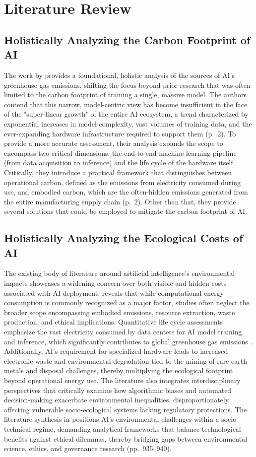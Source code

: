 \documentclass[a4paper, 12pt]{article}
\begin{document}
\section{Literature Review}
\subsection{Holistically Analyzing the Carbon Footprint of AI}
The work by \citet{Wu2022} provides a foundational, holistic analysis of the sources of AI's greenhouse gas emissions, shifting the focus beyond prior research that was often limited to the carbon footprint of training a single, massive model. The authors contend that this narrow, model-centric view has become insufficient in the face of the "super-linear growth" of the entire AI ecosystem, a trend characterized by exponential increases in model complexity, vast volumes of training data, and the ever-expanding hardware infrastructure required to support them (p.~2). To provide a more accurate assessment, their analysis expands the scope to encompass two critical dimensions: the end-to-end machine learning pipeline (from data acquisition to inference) and the life cycle of the hardware itself. Critically, they introduce a practical framework that distinguishes between operational carbon, defined as the emissions from electricity consumed during use, and embodied carbon, which are the often-hidden emissions generated from the entire manufacturing supply chain (p.~2). Other than that, they provide several solutions that could be employed to mitigate the carbon footprint of AI.

\subsection{Holistically Analyzing the Ecological Costs of AI}
The existing body of literature around artificial intelligence's environmental impacts showcases a widening concern over both visible and hidden costs associated with AI deployment. \citet{Zhuk2023} reveals that while computational energy consumption is commonly recognized as a major factor, studies often neglect the broader scope encompassing embodied emissions, resource extraction, waste production, and ethical implications. Quantitative life cycle assessments emphasize the vast electricity consumed by data centers for AI model training and inference, which significantly contributes to global greenhouse gas emissions \citep{Zhuk2023}. Additionally, AI's requirement for specialized hardware leads to increased electronic waste and environmental degradation tied to the mining of rare earth metals and disposal challenges, thereby multiplying the ecological footprint beyond operational energy use. The literature also integrates interdisciplinary perspectives that critically examine how algorithmic biases and automated decision-making exacerbate environmental inequalities, disproportionately affecting vulnerable socio-ecological systems lacking regulatory protections. The literature synthesis in \citet{Zhuk2023} positions AI's environmental challenges within a socio-technical regime, demanding analytical frameworks that balance technological benefits against ethical dilemmas, thereby bridging gaps between environmental science, ethics, and governance research (pp.~935--940).
\end{document}
